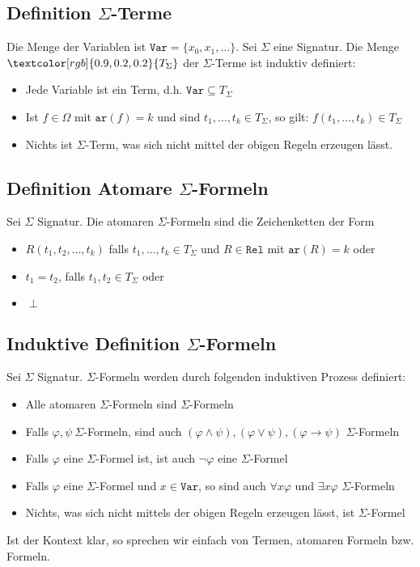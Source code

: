\documentclass[12pt,a4paper]{report}
\newcommand{\ra}{\rightarrow}
\newcommand{\ls}{\newline\newline}
\newcommand{\red}[1]{\textcolor[rgb]{0.9,0.2,0.2}{#1}}
\newcommand{\blue}[1]{\textcolor[rgb]{0.2,0.2,1}{#1}}
\begin{document}
\subsection{\blue{Definition $ \Sigma $-Terme}}
Die \red{Menge der Variablen} ist $ \texttt{Var} = \{x_0,x_1,\dots\} $.\ls
Sei $ \Sigma $ eine Signatur. Die Menge $ \red{T_\Sigma} $ der \red{$ \Sigma $-Terme} ist induktiv definiert:
\begin{itemize}
    \item Jede Variable ist ein Term, d.h. $ \texttt{Var} \subseteq T_\Sigma $
    \item Ist $ f \in \Omega $ mit $ \texttt{ar}(f) =k$ und sind $ t_1,\dots,t_k \in T_\Sigma $, so gilt: $ f(t_1,\dots,t_k) \in T_\Sigma $
    \item Nichts ist $ \Sigma $-Term, was sich nicht mittel der obigen Regeln erzeugen lässt.
\end{itemize}
\subsection{\blue{Definition Atomare $ \Sigma $-Formeln}}
Sei $ \Sigma $ Signatur. Die \red{atomaren $ \Sigma $-Formeln} sind die Zeichenketten der Form
\begin{itemize}
    \item $ R(t_1,t_2,\dots,t_k) $ falls $ t_1,\dots,t_k \in T_\Sigma $ und $ R \in \texttt{Rel} $ mit $ \texttt{ar}(R) = k $ oder
    \item $ t_1 = t_2 $, falls $ t_1, t_2 \in T_\Sigma $ oder
    \item $ \perp $
\end{itemize}
\subsection{\blue{Induktive Definition $ \Sigma $-Formeln}}
Sei $ \Sigma $ Signatur. \red{$ \Sigma $-Formeln} werden durch folgenden induktiven Prozess definiert:
\begin{itemize}
    \item Alle atomaren $ \Sigma $-Formeln sind $ \Sigma $-Formeln
    \item Falls $ \varphi, \psi~ \Sigma$-Formeln, sind auch $ (\varphi \wedge \psi), (\varphi \vee \psi), (\varphi \ra \psi) $ $ \Sigma $-Formeln
    \item Falls $ \varphi $ eine $ \Sigma $-Formel ist, ist auch $ \lnot \varphi $ eine $ \Sigma $-Formel
    \item Falls $ \varphi $ eine $ \Sigma $-Formel und $ x \in \texttt{Var} $, so sind auch $ \forall x \varphi $ und $ \exists x \varphi $ $ \Sigma $-Formeln
    \item Nichts, was sich nicht mittels der obigen Regeln erzeugen lässt, ist $ \Sigma $-Formel
\end{itemize}
Ist der Kontext klar, so sprechen wir einfach von \red{Termen, atomaren Formeln bzw. Formeln}.
\end{document}
